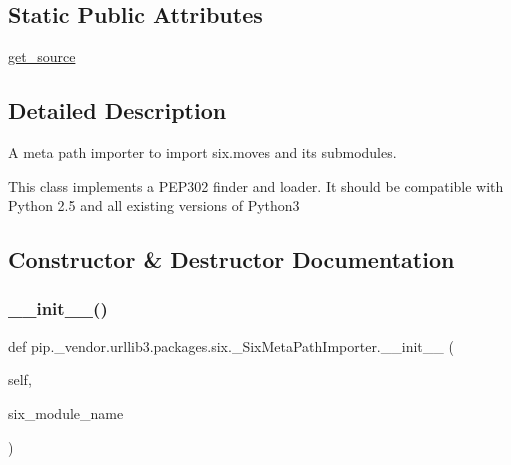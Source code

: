 \subsection*{Static Public Attributes}
\begin{DoxyCompactItemize}
\item 
\hyperlink{classpip_1_1__vendor_1_1urllib3_1_1packages_1_1six_1_1__SixMetaPathImporter_a4705f32f97749d7c3166f50d05fbc90a}{get\+\_\+source}
\end{DoxyCompactItemize}


\subsection{Detailed Description}
\begin{DoxyVerb}A meta path importer to import six.moves and its submodules.

This class implements a PEP302 finder and loader. It should be compatible
with Python 2.5 and all existing versions of Python3
\end{DoxyVerb}
 

\subsection{Constructor \& Destructor Documentation}
\mbox{\label{classpip_1_1__vendor_1_1urllib3_1_1packages_1_1six_1_1__SixMetaPathImporter_a41f3d827c419d084b13ab6c0c857f394}} 
\subsubsection{\texorpdfstring{\+\_\+\+\_\+init\+\_\+\+\_\+()}{\_\_init\_\_()}}
{\footnotesize\ttfamily def pip.\+\_\+vendor.\+urllib3.\+packages.\+six.\+\_\+\+Six\+Meta\+Path\+Importer.\+\_\+\+\_\+init\+\_\+\+\_\+ (\begin{DoxyParamCaption}\item[{}]{self,  }\item[{}]{six\+\_\+module\+\_\+name }\end{DoxyParamCaption})}



